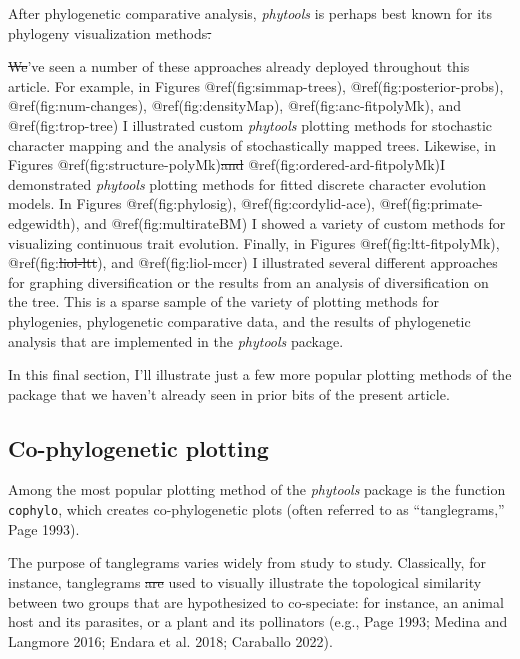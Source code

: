 \documentclass[fleqn,10pt,lineno]{wlpeerj}
\providecommand{\DIFaddtex}[1]{{\protect\color{blue}\uwave{#1}}} %
\providecommand{\DIFdeltex}[1]{{\protect\color{red}\sout{#1}}}                      %
\providecommand{\DIFaddbegin}{} %
\providecommand{\DIFaddend}{} %
\providecommand{\DIFdelbegin}{} %
\providecommand{\DIFdelend}{} %
\providecommand{\DIFadd}[1]{\texorpdfstring{\DIFaddtex{#1}}{#1}} %
\providecommand{\DIFdel}[1]{\texorpdfstring{\DIFdeltex{#1}}{}} %
\newcommand{\DIFscaledelfig}{0.5}
\newlength{\DIFdelgraphicswidth} %
\newlength{\DIFdelgraphicsheight} %
\newcommand{\DIFaddincludegraphics}[2][]{{\color{blue}\fbox{\DIFOincludegraphics[#1]{#2}}}} %
\newcommand{\DIFdelincludegraphics}[2][]{%
\sbox{\DIFdelgraphicsbox}{\DIFOincludegraphics[#1]{#2}}%
\settoboxwidth{\DIFdelgraphicswidth}{\DIFdelgraphicsbox} %
\settoboxtotalheight{\DIFdelgraphicsheight}{\DIFdelgraphicsbox} %
\scalebox{\DIFscaledelfig}{%
\parbox[b]{\DIFdelgraphicswidth}{\usebox{\DIFdelgraphicsbox}\\[-\baselineskip] \rule{\DIFdelgraphicswidth}{0em}}\llap{\resizebox{\DIFdelgraphicswidth}{\DIFdelgraphicsheight}{%
\setlength{\unitlength}{\DIFdelgraphicswidth}%
\begin{picture}(1,1)%
\thicklines\linethickness{2pt} %
{\color[rgb]{1,0,0}\put(0,0){\framebox(1,1){}}}%
{\color[rgb]{1,0,0}\put(0,0){\line( 1,1){1}}}%
{\color[rgb]{1,0,0}\put(0,1){\line(1,-1){1}}}%
\end{picture}%
}\hspace*{3pt}}} %
} %
\DeclareRobustCommand{\DIFaddbegin}{\DIFOaddbegin \let\includegraphics\DIFaddincludegraphics} %
\DeclareRobustCommand{\DIFaddend}{\DIFOaddend \let\includegraphics\DIFOincludegraphics} %
\DeclareRobustCommand{\DIFdelbegin}{\DIFOdelbegin \let\includegraphics\DIFdelincludegraphics} %
\DeclareRobustCommand{\DIFdelend}{\DIFOaddend \let\includegraphics\DIFOincludegraphics} %
\begin{document}
After phylogenetic comparative analysis, \emph{phytools} is perhaps best
known for its phylogeny visualization methods\DIFdelbegin \DIFdel{.
}%

\DIFdel{We}\DIFdelend \DIFaddbegin \DIFadd{, and we}\DIFaddend 've seen a number
of these approaches already deployed throughout this article. For
example, in Figures @ref(fig:simmap-trees), @ref(fig:posterior-probs),
@ref(fig:num-changes), @ref(fig:densityMap), @ref(fig:anc-fitpolyMk),
and @ref(fig:trop-tree) I illustrated custom \emph{phytools} plotting
methods for stochastic character mapping and the analysis of
stochastically mapped trees. Likewise, in Figures
@ref(fig:structure-polyMk)\DIFdelbegin \DIFdel{and }\DIFdelend \DIFaddbegin \DIFadd{, }\DIFaddend @ref(fig:ordered-ard-fitpolyMk)\DIFaddbegin \DIFadd{, and
@ref(fig:anc-fitHRM) }\DIFaddend I demonstrated \emph{phytools} plotting methods for
fitted discrete character evolution models. In Figures
@ref(fig:phylosig), @ref(fig:cordylid-ace), @ref(fig:primate-edgewidth),
and @ref(fig:multirateBM) I showed a variety of custom methods for
visualizing continuous trait evolution. Finally, in Figures
@ref(fig:ltt-fitpolyMk), @ref(fig:\DIFdelbegin \DIFdel{liol-ltt}\DIFdelend \DIFaddbegin \DIFadd{elap-ltt}\DIFaddend ), and @ref(fig:liol-mccr) I
illustrated several different approaches for graphing diversification or
the results from an analysis of diversification on the tree. This is a
sparse sample of the variety of plotting methods for phylogenies,
phylogenetic comparative data, and the results of phylogenetic analysis
that are implemented in the \emph{phytools} package.

In this final section, I'll illustrate just a few more popular plotting
methods of the package that we haven't already seen in prior bits of the
present article.

\hypertarget{co-phylogenetic-plotting}{%
\subsection{Co-phylogenetic plotting}\label{co-phylogenetic-plotting}}

Among the most popular plotting method of the \emph{phytools} package is
the function \texttt{cophylo}, which creates co-phylogenetic plots
(often referred to as ``tanglegrams,'' Page 1993).

The purpose of tanglegrams varies widely from study to study.
Classically, for instance, tanglegrams \DIFdelbegin \DIFdel{are }\DIFdelend \DIFaddbegin \DIFadd{have been }\DIFaddend used to visually
illustrate the topological similarity between two groups that are
hypothesized to co-speciate: for instance, an animal host and its
parasites, or a plant and its pollinators (e.g., Page 1993; Medina and
Langmore 2016; Endara et al. 2018; Caraballo 2022).
\end{document}
